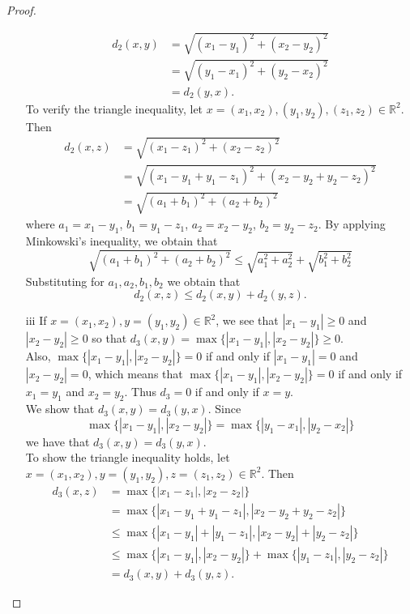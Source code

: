 \documentclass[11pt,a4paper]{article}
\theoremstyle{definition}
\begin{document}
\begin{proof}
\begin{enumerate}
\begin{align*}
d_2(x,y) &=\sqrt{(x_1-y_1)^2+(x_2-y_2)^2}\\
         &=\sqrt{(y_1-x_1)^2+(y_2-x_2)^2}\\
         &=d_2(y,x).
\end{align*}
To verify the triangle inequality, let $x=(x_1,x_2), (y_1,y_2), (z_1,z_2)\in \mathbb{R}^2$. Then
\begin{align*}
d_2(x,z) &=\sqrt{(x_1-z_1)^2+(x_2-z_2)^2}\\
         &=\sqrt{(x_1-y_1+y_1-z_1)^2+(x_2-y_2+y_2-z_2)^2}\\
         &=\sqrt{(a_1+b_1)^2+(a_2+b_2)^2}
\end{align*}
where $a_1=x_1-y_1$, $b_1=y_1-z_1$, $a_2=x_2-y_2$, $b_2=y_2-z_2$. By applying Minkowski's inequality, we obtain that $$\sqrt{(a_1+b_1)^2+(a_2+b_2)^2}\leq \sqrt{a^2_1 +a_2^2}+\sqrt{b_1^2+b_2^2}$$ Substituting for $a_1,a_2,b_1,b_2$ we obtain that $$d_2(x,z)\leq d_2(x,y)+d_2(y,z).$$




\item[iii] If $x=(x_1,x_2), y=(y_1,y_2) \in \mathbb{R}^2$, we see that $|x_1-y_1|\geq 0$ and $|x_2-y_2|\geq 0$ so that $d_3(x,y)=\max\{|x_1-y_1|,|x_2-y_2|\}\geq 0$.\\ Also, $\max\{|x_1-y_1|,|x_2-y_2|\}=0$ if and only if $|x_1-y_1|=0$ and $|x_2-y_2|=0$, which means that $\max\{|x_1-y_1|,|x_2-y_2|\}=0$ if and only if $x_1=y_1$ and $x_2=y_2$. Thus $d_3=0$ if and only if $x=y$.\\ We show that $d_3(x,y)=d_3(y,x)$. Since $$\max\{|x_1-y_1|,|x_2-y_2|\}=\max\{|y_1-x_1|,|y_2-x_2|\}$$ we have that $d_3(x,y)=d_3(y,x)$.\\ To show the triangle inequality holds, let $x=(x_1,x_2), y=(y_1,y_2), z=(z_1,z_2)\in \mathbb{R}^2$. Then
\begin{align*}
d_3(x,z) &=\max\{|x_1-z_1|,|x_2-z_2|\}\\
         &=\max\{|x_1-y_1+y_1-z_1|,|x_2-y_2+y_2-z_2|\}\\
         &\leq \max\{|x_1-y_1|+|y_1-z_1|,|x_2-y_2|+|y_2-z_2|\}\\
         &\leq \max\{|x_1-y_1|,|x_2-y_2|\} +\max\{|y_1-z_1|,|y_2-z_2|\}\\
         &=d_3(x,y) +d_3(y,z).
\end{align*}            
\end{enumerate}
\end{proof}
\end{document}
